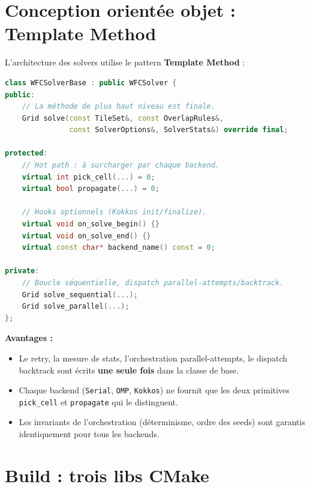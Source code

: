 \section{Conception orientée objet : Template Method}
\label{sec:impl:tm}

L'architecture des solvers utilise le pattern \textbf{Template Method} :

\begin{lstlisting}[language=C++]
class WFCSolverBase : public WFCSolver {
public:
    // La méthode de plus haut niveau est finale.
    Grid solve(const TileSet&, const OverlapRules&,
               const SolverOptions&, SolverStats&) override final;

protected:
    // Hot path : à surcharger par chaque backend.
    virtual int pick_cell(...) = 0;
    virtual bool propagate(...) = 0;

    // Hooks optionnels (Kokkos init/finalize).
    virtual void on_solve_begin() {}
    virtual void on_solve_end() {}
    virtual const char* backend_name() const = 0;

private:
    // Boucle séquentielle, dispatch parallel-attempts/backtrack.
    Grid solve_sequential(...);
    Grid solve_parallel(...);
};
\end{lstlisting}

\textbf{Avantages :}
\begin{itemize}
    \item Le retry, la mesure de stats, l'orchestration parallel-attempts, le dispatch backtrack sont écrits \textbf{une seule fois} dans la classe de base.
    \item Chaque backend (\texttt{Serial}, \texttt{OMP}, \texttt{Kokkos}) ne fournit que les deux primitives \texttt{pick\_cell} et \texttt{propagate} qui le distinguent.
    \item Les invariants de l'orchestration (déterminisme, ordre des seeds) sont garantis identiquement pour tous les backends.
\end{itemize}

\section{Build : trois libs CMake}
\label{sec:impl:cmake}

